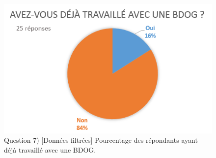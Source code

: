 \documentclass[a4paper,fleqn,12pt,oneside]{report}
\begin{document}
\begin{figure}[!ht]
\centering
\includegraphics[scale=0.8]{figures/QTravFilt.png}
\caption{Question 7) [Données filtrées] Pourcentage des répondants ayant déjà travaillé avec une BDOG.}
\label{fig:QTravFilt}
\end{figure}
\end{document}
